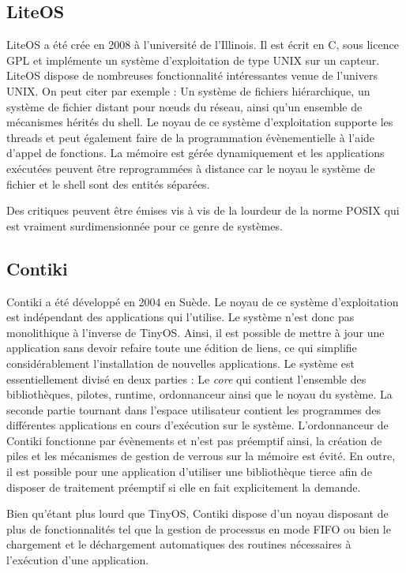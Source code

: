 \subsection{LiteOS}

LiteOS \cite{Cao_theliteos} a été crée en 2008 à l'université de l'Illinois. Il
est écrit en C, sous licence GPL et implémente un système d'exploitation de
type UNIX sur un capteur. LiteOS dispose de nombreuses fonctionnalité
intéressantes venue de l'univers UNIX. On peut citer par exemple : Un système
de fichiers hiérarchique, un système de fichier distant pour nœuds du réseau,
ainsi qu'un ensemble de mécanismes hérités du shell. Le noyau de ce système
d'exploitation supporte les threads et peut également faire de la programmation
évènementielle à l'aide d'appel de fonctions.  La mémoire est gérée
dynamiquement et les applications exécutées peuvent être reprogrammées à
distance car le noyau le système de fichier et le shell sont des entités
séparées.

Des critiques peuvent être émises vis à vis de la lourdeur de la norme POSIX
qui est vraiment surdimensionnée pour ce genre de systèmes.


\subsection{Contiki}


Contiki \cite{dunkels04contiki} a été développé en 2004 en Suède.  Le noyau de
ce système d'exploitation est indépendant des applications qui l'utilise. Le
système n'est donc pas monolithique à l'inverse de TinyOS.  Ainsi, il est
possible de mettre à jour une application sans devoir refaire toute une édition
de liens, ce qui simplifie considérablement l'installation de nouvelles
applications. Le système est essentiellement divisé en deux parties : Le
\textit{core} qui contient l'ensemble des bibliothèques, pilotes, runtime,
ordonnanceur ainsi que le noyau du système. La seconde partie tournant dans
l'espace utilisateur contient les programmes des différentes applications en
cours d'exécution sur le système. L'ordonnanceur de Contiki fonctionne par
évènements et n'est pas préemptif ainsi, la création de piles et les mécanismes
de gestion de verrous sur la mémoire est évité. En outre, il est possible pour
une application d'utiliser une bibliothèque tierce afin de disposer de
traitement préemptif si elle en fait explicitement la demande.

Bien qu'étant plus lourd que TinyOS, Contiki dispose d'un noyau disposant de
plus de fonctionnalités tel que la gestion de processus en mode FIFO ou bien le
chargement et le déchargement automatiques des routines nécessaires à
l'exécution d'une application.

